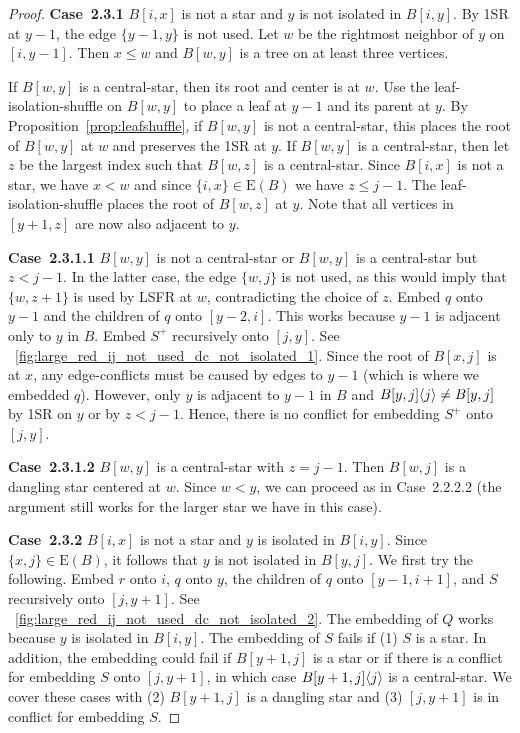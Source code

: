 \documentclass[11pt,a4paper,colorlinks=true,urlcolor=blue,citecolor=red]{article}
\theoremstyle{plain}
\newcommand{\case}[1]{\par\vspace{.5\baselineskip}\noindent\textbf{\sffamily Case~#1}}
\newcommand{\EB}{\mathrm{E}(B)}
\begin{document}
\begin{proof}
  \case{2.3.1} $B[i,x]$ is not a star and $y$ is not isolated in
  $B[i,y]$. By 1SR at $y-1$, the edge $\{y-1,y\}$ is not used. Let $w$
  be the rightmost neighbor of $y$ on $[i,y-1]$. Then $x\leq w$ and
  $B[w,y]$ is a tree on at least three vertices.

  If $B[w,y]$ is a central-star, then its root and center is at $w$. Use
  the leaf-isolation-shuffle on $B[w,y]$ to place a leaf at $y-1$ and
  its parent at $y$. By Proposition~\ref{prop:leafshuffle}, if $B[w,y]$
  is not a central-star, this places the root of $B[w,y]$ at $w$ and
  preserves the 1SR at $y$. If $B[w,y]$ is a central-star, then let $z$
  be the largest index such that $B[w,z]$ is a central-star. Since
  $B[i,x]$ is not a star, we have $x<w$ and since $\{i,x\}\in\EB$ we
  have $z\leq j-1$. The leaf-isolation-shuffle places the root of
  $B[w,z]$ at $y$. Note that all vertices in $[y+1,z]$ are now also
  adjacent to $y$.

  \case{2.3.1.1} $B[w,y]$ is not a central-star or $B[w,y]$ is a
  central-star but $z<j-1$. In the latter case, the edge $\{w,j\}$ is
  not used, as this would imply that $\{w,z+1\}$ is used by LSFR at $w$,
  contradicting the choice of $z$. Embed $q$ onto $y-1$ and the children
  of $q$ onto $[y-2,i]$. This works because $y-1$ is adjacent only to
  $y$ in $B$. Embed $S^+$ recursively onto $[j,y]$. See
  \figurename~\ref{fig:large_red_ij_not_used_dc_not_isolated_1}. Since
  the root of $B[x,j]$ is at $x$, any edge-conflicts must be caused by
  edges to $y-1$ (which is where we embedded $q$). However, only $y$ is
  adjacent to $y-1$ in $B$ and $B{[y,j]}\langle{j}\rangle\neq B[y,j]$ by 1SR on
  $y$ or by $z<j-1$. Hence, there is no conflict for embedding $S^+$
  onto $[j,y]$.

  \case{2.3.1.2} $B[w,y]$ is a central-star with $z=j-1$. Then $B[w,j]$ is
  a dangling star centered at $w$. Since $w<y$, we can proceed as in
  Case~2.2.2.2 (the argument still works for the larger star we have in
  this case).

  \case{2.3.2} $B[i,x]$ is not a star and $y$ is isolated in $B[i,y]$.
  Since $\{x,j\}\in\EB$, it follows that $y$ is not isolated in
  $B[y,j]$. We first try the following. Embed $r$ onto $i$, $q$ onto
  $y$, the children of $q$ onto $[y-1,i+1]$, and $S$ recursively onto
  $[j,y+1]$. See
  \figurename~\ref{fig:large_red_ij_not_used_dc_not_isolated_2}. The
  embedding of $Q$ works because $y$ is isolated in $B[i,y]$. The
  embedding of $S$ fails if (1) $S$ is a star. In addition, the
  embedding could fail if $B[y+1,j]$ is a star or if there is a conflict
  for embedding $S$ onto $[j,y+1]$, in which case $B{[y+1,j]}\langle{j}\rangle$
  is a central-star. We cover these cases with (2) $B[y+1,j]$ is a
  dangling star and (3) $[j,y+1]$ is in conflict for embedding $S$.


\end{proof}
\end{document}
